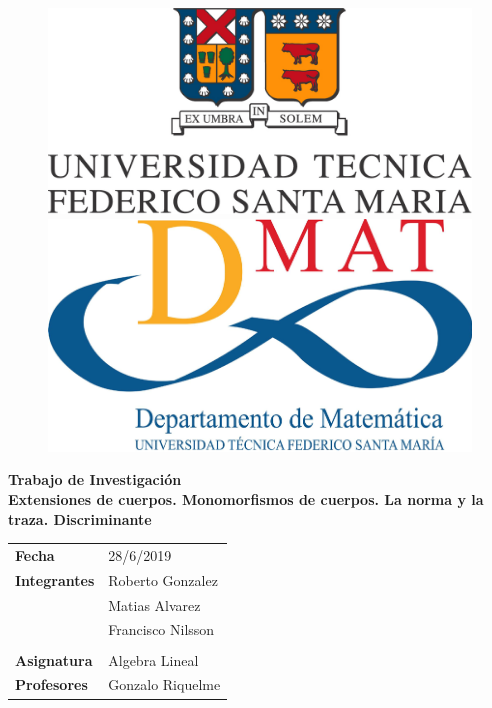 \documentclass[final, letterpaper, 12pt]{article}
\begin{document}
\justifying
\begin{titlepage}

\begin{figure}[t]
\includegraphics[width=0.33\linewidth]{Imagenes/1MAIN/logo-usm-g.jpg} \hspace{4.8cm}
\includegraphics[width=0.33\linewidth]{Imagenes/1MAIN/logo_mat.png}\\[3.2cm]
\end{figure}

\begin{center}
\Huge{ \bfseries{Trabajo de Investigación\\[1.1cm]
Extensiones de cuerpos. Monomorfismos de cuerpos. La norma y la traza. Discriminante\\[1.8cm]}}
\end{center}

\begin{table}[h]
\centering
\begin{tabular}{ll}
\textbf{Fecha}       & 28/6/2019                          \\
\textbf{Integrantes} & Roberto Gonzalez          \\
                     & Matias Alvarez             \\
                     & Francisco Nilsson              \\
\multicolumn{2}{l}{}                                       \\
\textbf{Asignatura}  & Algebra Lineal \\
\textbf{Profesores}  & Gonzalo Riquelme  \\                   
\end{tabular}
\end{table}

\vspace{1.5cm}
\begin{center}
\end{center}
\end{titlepage}
\end{document}

